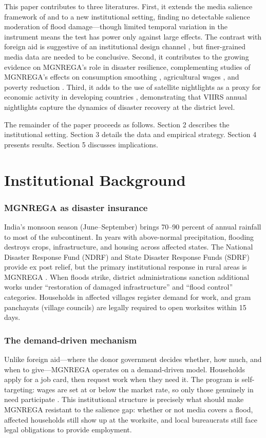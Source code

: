 \documentclass[12pt]{article}
\begin{document}
This paper contributes to three literatures. First, it extends the media salience framework of \citet{eisensee2007} and \citet{stromberg2004} to a new institutional setting, finding no detectable salience moderation of flood damage---though limited temporal variation in the instrument means the test has power only against large effects. The contrast with foreign aid is suggestive of an institutional design channel \citep{sen1999}, but finer-grained media data are needed to be conclusive. Second, it contributes to the growing evidence on MGNREGA's role in disaster resilience, complementing studies of MGNREGA's effects on consumption smoothing \citep{imbert2015}, agricultural wages \citep{berg2018}, and poverty reduction \citep{klonner2013}. Third, it adds to the use of satellite nightlights as a proxy for economic activity in developing countries \citep{henderson2012, donaldson2016}, demonstrating that VIIRS annual nightlights capture the dynamics of disaster recovery at the district level.

The remainder of the paper proceeds as follows. Section 2 describes the institutional setting. Section 3 details the data and empirical strategy. Section 4 presents results. Section 5 discusses implications.


\section{Institutional Background}

\subsubsection*{MGNREGA as disaster insurance} India's monsoon season (June--September) brings 70--90 percent of annual rainfall to most of the subcontinent. In years with above-normal precipitation, flooding destroys crops, infrastructure, and housing across affected states. The National Disaster Response Fund (NDRF) and State Disaster Response Funds (SDRF) provide ex post relief, but the primary institutional response in rural areas is MGNREGA \citep{dreze2011}. When floods strike, district administrations sanction additional works under ``restoration of damaged infrastructure'' and ``flood control'' categories. Households in affected villages register demand for work, and gram panchayats (village councils) are legally required to open worksites within 15 days.

\subsubsection*{The demand-driven mechanism} Unlike foreign aid---where the donor government decides whether, how much, and when to give---MGNREGA operates on a demand-driven model. Households apply for a job card, then request work when they need it. The program is self-targeting: wages are set at or below the market rate, so only those genuinely in need participate \citep{zimmermann2012}. This institutional structure is precisely what should make MGNREGA resistant to the salience gap: whether or not media covers a flood, affected households still show up at the worksite, and local bureaucrats still face legal obligations to provide employment.
\end{document}

